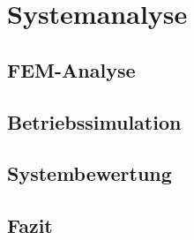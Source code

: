 \chapter{Systemanalyse}\label{sec:simulation}


\section{FEM-Analyse}

\section{Betriebssimulation}

\section{Systembewertung}

\section{Fazit}